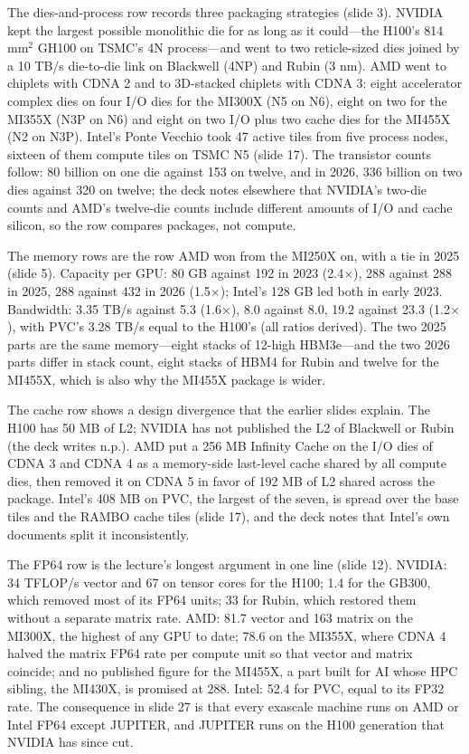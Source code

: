 \documentclass[11pt,letterpaper]{article}
\begin{document}
The dies-and-process row records three packaging strategies (slide 3). NVIDIA kept the largest possible monolithic die for as long as it could---the H100's 814 mm$^2$ GH100 on TSMC's 4N process---and went to two reticle-sized dies joined by a 10 TB/s die-to-die link on Blackwell (4NP) and Rubin (3 nm). AMD went to chiplets with CDNA 2 and to 3D-stacked chiplets with CDNA 3: eight accelerator complex dies on four I/O dies for the MI300X (N5 on N6), eight on two for the MI355X (N3P on N6) and eight on two I/O plus two cache dies for the MI455X (N2 on N3P). Intel's Ponte Vecchio took 47 active tiles from five process nodes, sixteen of them compute tiles on TSMC N5 (slide 17). The transistor counts follow: 80 billion on one die against 153 on twelve, and in 2026, 336 billion on two dies against 320 on twelve; the deck notes elsewhere that NVIDIA's two-die counts and AMD's twelve-die counts include different amounts of I/O and cache silicon, so the row compares packages, not compute.

The memory rows are the row AMD won from the MI250X on, with a tie in 2025 (slide 5). Capacity per GPU: 80 GB against 192 in 2023 (2.4$\times$), 288 against 288 in 2025, 288 against 432 in 2026 (1.5$\times$); Intel's 128 GB led both in early 2023. Bandwidth: 3.35 TB/s against 5.3 (1.6$\times$), 8.0 against 8.0, 19.2 against 23.3 (1.2$\times$), with PVC's 3.28 TB/s equal to the H100's (all ratios derived). The two 2025 parts are the same memory---eight stacks of 12-high HBM3e---and the two 2026 parts differ in stack count, eight stacks of HBM4 for Rubin and twelve for the MI455X, which is also why the MI455X package is wider.

The cache row shows a design divergence that the earlier slides explain. The H100 has 50 MB of L2; NVIDIA has not published the L2 of Blackwell or Rubin (the deck writes n.p.). AMD put a 256 MB Infinity Cache on the I/O dies of CDNA 3 and CDNA 4 as a memory-side last-level cache shared by all compute dies, then removed it on CDNA 5 in favor of 192 MB of L2 shared across the package. Intel's 408 MB on PVC, the largest of the seven, is spread over the base tiles and the RAMBO cache tiles (slide 17), and the deck notes that Intel's own documents split it inconsistently.

The FP64 row is the lecture's longest argument in one line (slide 12). NVIDIA: 34 TFLOP/s vector and 67 on tensor cores for the H100; 1.4 for the GB300, which removed most of its FP64 units; 33 for Rubin, which restored them without a separate matrix rate. AMD: 81.7 vector and 163 matrix on the MI300X, the highest of any GPU to date; 78.6 on the MI355X, where CDNA 4 halved the matrix FP64 rate per compute unit so that vector and matrix coincide; and no published figure for the MI455X, a part built for AI whose HPC sibling, the MI430X, is promised at 288. Intel: 52.4 for PVC, equal to its FP32 rate. The consequence in slide 27 is that every exascale machine runs on AMD or Intel FP64 except JUPITER, and JUPITER runs on the H100 generation that NVIDIA has since cut.
\end{document}
